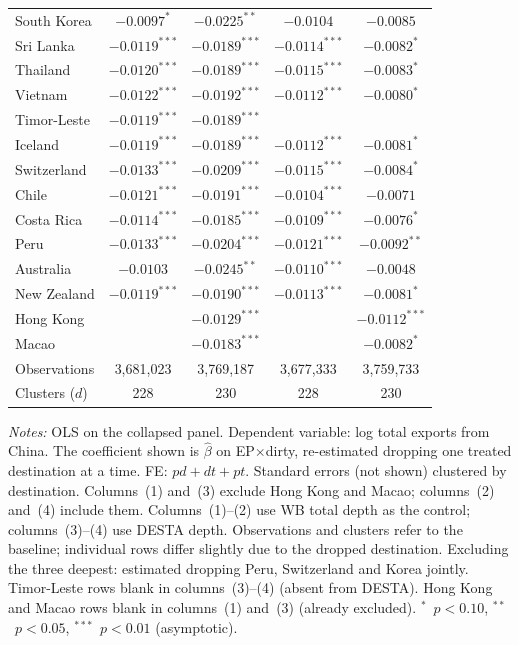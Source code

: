 \begin{table}[p]
\begin{threeparttable}
\begin{tabular}{lcccc}
South Korea    & $-0.0097^{*}$   & $-0.0225^{**}$  & $-0.0104$       & $-0.0085$      \\
Sri Lanka      & $-0.0119^{***}$ & $-0.0189^{***}$ & $-0.0114^{***}$ & $-0.0082^{*}$  \\
Thailand       & $-0.0120^{***}$ & $-0.0189^{***}$ & $-0.0115^{***}$ & $-0.0083^{*}$  \\
Vietnam        & $-0.0122^{***}$ & $-0.0192^{***}$ & $-0.0112^{***}$ & $-0.0080^{*}$  \\
Timor-Leste    & $-0.0119^{***}$ & $-0.0189^{***}$ &                 &                \\
Iceland        & $-0.0119^{***}$ & $-0.0189^{***}$ & $-0.0112^{***}$ & $-0.0081^{*}$  \\
Switzerland    & $-0.0133^{***}$ & $-0.0209^{***}$ & $-0.0115^{***}$ & $-0.0084^{*}$  \\
Chile          & $-0.0121^{***}$ & $-0.0191^{***}$ & $-0.0104^{***}$ & $-0.0071$      \\
Costa Rica     & $-0.0114^{***}$ & $-0.0185^{***}$ & $-0.0109^{***}$ & $-0.0076^{*}$  \\
Peru           & $-0.0133^{***}$ & $-0.0204^{***}$ & $-0.0121^{***}$ & $-0.0092^{**}$ \\
Australia      & $-0.0103$       & $-0.0245^{**}$  & $-0.0110^{***}$ & $-0.0048$      \\
New Zealand    & $-0.0119^{***}$ & $-0.0190^{***}$ & $-0.0113^{***}$ & $-0.0081^{*}$  \\
\midrule
Hong Kong      &                 & $-0.0129^{***}$ &                 & $-0.0112^{***}$ \\
Macao          &                 & $-0.0183^{***}$ &                 & $-0.0082^{*}$  \\
\midrule
Observations   & 3,681,023       & 3,769,187       & 3,677,333       & 3,759,733      \\
Clusters ($d$) & 228             & 230             & 228             & 230            \\
\bottomrule
\end{tabular}
\begin{tablenotes}[flushleft]\footnotesize
\item \emph{Notes:} OLS on the collapsed panel. Dependent variable: log total exports from China. The coefficient shown is $\widehat{\beta}$ on EP$\times$dirty, re-estimated dropping one treated destination at a time. FE: $pd + dt + pt$. Standard errors (not shown) clustered by destination. Columns~(1) and~(3) exclude Hong Kong and Macao; columns~(2) and~(4) include them. Columns~(1)--(2) use WB total depth as the control; columns~(3)--(4) use DESTA depth. Observations and clusters refer to the baseline; individual rows differ slightly due to the dropped destination. Excluding the three deepest: estimated dropping Peru, Switzerland and Korea jointly. Timor-Leste rows blank in columns~(3)--(4) (absent from DESTA). Hong Kong and Macao rows blank in columns~(1) and~(3) (already excluded). $^{*}$~$p<0.10$, $^{**}$~$p<0.05$, $^{***}$~$p<0.01$ (asymptotic).

\end{tablenotes}
\end{threeparttable}
\end{table}
